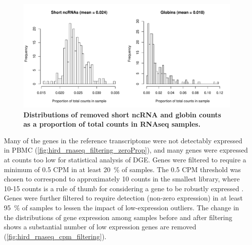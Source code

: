 \begin{figure}
    \centering
    \includegraphics[width=1.0\textwidth, page=1]{mainmatter/figures/chapter_02/rnaseq_data_setup.per_sample.short_ncRNA_globin_levels_hist.pdf}
    \caption{\textbf{Distributions of removed short \gls{ncRNA} and globin counts as a proportion of total counts in \gls{RNAseq} samples.}}
    \label{fig:hird_shortncRNA_and_globins}
\end{figure}

Many of the genes in the reference transcriptome were not detectably expressed in \gls{PBMC} (\cref{fig:hird_rnaseq_filtering_zeroProp}), and many genes were expressed at counts too low for statistical analysis of \gls{DGE}.
Genes were filtered to require a minimum of 0.5 \gls{CPM} in at least \SI{20}{\percent} of samples.
The 0.5 \gls{CPM} threshold was chosen to correspond to approximately 10 counts in the smallest library, where 10-15 counts is a rule of thumb for considering a gene to be robustly expressed \autocite{chen2016ReadsGenesPathways,law2018RNAseqAnalysisEasy}.
Genes were further filtered to require detection (non-zero expression) in at least \SI{95}{\percent} of samples to lessen the impact of low-expression outliers.
The change in the distributions of gene expression among samples before and after filtering shows a substantial number of low expression genes are removed (\cref{fig:hird_rnaseq_cpm_filtering}).

